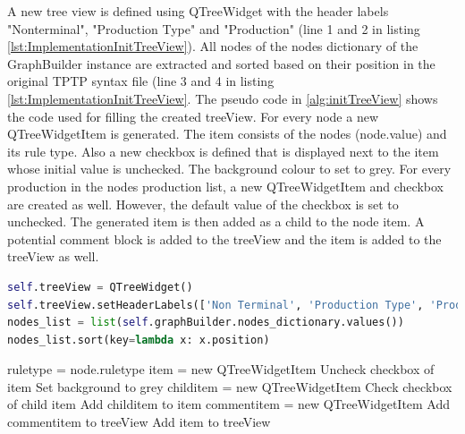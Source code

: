A new tree view is defined using QTreeWidget with the header labels "Nonterminal", "Production Type" and "Production" (line 1 and 2 in listing \ref{lst:ImplementationInitTreeView}).
All nodes of the nodes dictionary of the GraphBuilder instance are extracted and sorted based on their position in the original \ac{TPTP} syntax file (line 3 and 4 in listing \ref{lst:ImplementationInitTreeView}. 
The pseudo code in \ref{alg:initTreeView} shows the code used for filling the created treeView. For every node a new QTreeWidgetItem is generated. The item consists of the nodes (node.value) and its rule type. Also a new checkbox is defined that is displayed next to the item whose initial value is unchecked. The background colour to set to grey.
For every production in the nodes production list, a new QTreeWidgetItem and checkbox are created as well. However, the default value of the checkbox is set to unchecked. The generated item is then added as a child to the node item. A potential comment block is added to the treeView and the item is added to the treeView as well.

\begin{lstlisting}[language=Python, basicstyle=\scriptsize	,caption= Init Tree View,label= lst:ImplementationInitTreeView]
self.treeView = QTreeWidget()
self.treeView.setHeaderLabels(['Non Terminal', 'Production Type', 'Production'])
nodes_list = list(self.graphBuilder.nodes_dictionary.values())
nodes_list.sort(key=lambda x: x.position)
\end{lstlisting}

\begin{algorithm}[H]
\caption{GUI Pseudo Code: init\textunderscore tree\textunderscore view}
\label{alg:initTreeView}
\begin{algorithmic}[1] 
	\State rule\textunderscore type = node.rule\textunderscore type
	\State item = new QTreeWidgetItem
    \State Uncheck checkbox of item 
    \State Set background to grey
		\State child\textunderscore item = new QTreeWidgetItem
		\State Check checkbox of child item
		\State Add child\textunderscore item to item
	\EndFor    
		\State comment\textunderscore item = new QTreeWidgetItem
		\State Add comment\textunderscore item to treeView
	\EndIf
	\State Add item to treeView
\EndFor
\end{algorithmic}
\end{algorithm}

